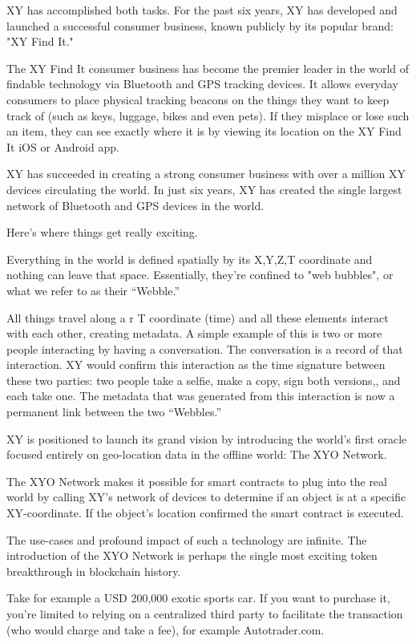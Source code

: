\documentclass{article}
\begin{document}
XY has accomplished both tasks. For the past six years, XY has developed and launched a successful consumer business, known publicly by its popular brand: "XY Find It." 

The XY Find It consumer business has become the premier leader in the world of findable technology via Bluetooth and GPS tracking devices. It allows everyday consumers to place physical tracking beacons on the things they want to keep track of (such as keys, luggage, bikes and even pets). If they misplace or lose such an item, they can see exactly where it is by viewing its location on the XY Find It iOS or Android app. 

XY has succeeded in creating a strong consumer business with over a million XY devices circulating the world. In just six years, XY has created the single largest network of Bluetooth and GPS devices in the world.

Here's where things get really exciting.

Everything in the world is defined spatially by its X,Y,Z,T coordinate and nothing can leave that space. Essentially, they're confined to "web bubbles", or what we refer to as their “Webble.” 

All things travel along a r T coordinate (time) and all these elements interact with each other, creating metadata. A simple example of this is two or more people interacting by having a conversation. The conversation is a record of that interaction. XY would confirm this interaction as the time signature between these two parties: two people take a selfie, make a copy, sign both versions,, and each take one. The metadata that was generated from this interaction is now a permanent link between the two “Webbles.”

XY is positioned to launch its grand vision by introducing the world's first oracle focused entirely on geo-location data in the offline world: The XYO Network. 

The XYO Network makes it possible for smart contracts to plug into the real world by calling XY's network of devices to determine if an object is at a specific XY-coordinate. If the object’s location confirmed the smart contract is executed. 

The use-cases and profound impact of such a technology are infinite. The introduction of the XYO Network is perhaps the single most exciting token breakthrough in blockchain history. 

Take for example a USD 200,000 exotic sports car. If you want to purchase it, you're limited to relying on a centralized third party to facilitate the transaction (who would  charge and take a fee), for example Autotrader.com.
\end{document}
